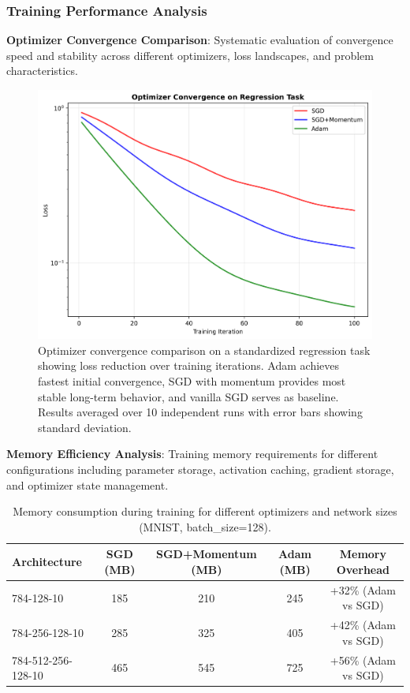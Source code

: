 \documentclass[11pt,a4paper]{report}
\begin{document}
\subsubsection{Training Performance Analysis}

\textbf{Optimizer Convergence Comparison}: Systematic evaluation of convergence speed and stability across different optimizers, loss landscapes, and problem characteristics.

\begin{figure}[H]
\centering
\includegraphics[width=\textwidth]{performance_optimizer_convergence.png}
\caption{Optimizer convergence comparison on a standardized regression task showing loss reduction over training iterations. Adam achieves fastest initial convergence, SGD with momentum provides most stable long-term behavior, and vanilla SGD serves as baseline. Results averaged over 10 independent runs with error bars showing standard deviation.}
\label{fig:optimizer_convergence}
\end{figure}

\textbf{Memory Efficiency Analysis}: Training memory requirements for different configurations including parameter storage, activation caching, gradient storage, and optimizer state management.

\begin{table}[H]
\centering
\caption{Memory consumption during training for different optimizers and network sizes (MNIST, batch\_size=128).}
\label{tab:memory_analysis}
\begin{tabular}{lcccc}
\toprule
Architecture & SGD (MB) & SGD+Momentum (MB) & Adam (MB) & Memory Overhead \\
\midrule
784-128-10 & 185 & 210 & 245 & +32\% (Adam vs SGD) \\
784-256-128-10 & 285 & 325 & 405 & +42\% (Adam vs SGD) \\
784-512-256-128-10 & 465 & 545 & 725 & +56\% (Adam vs SGD) \\
\bottomrule
\end{tabular}
\end{table}
\end{document}
